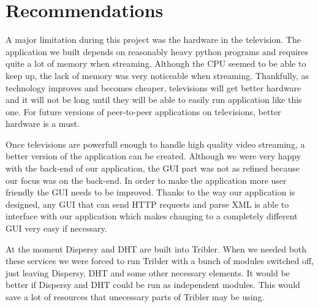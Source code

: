 \chapter{Recommendations}
\label{sec:recommendations}

A major limitation during this project was the hardware in the television. The application we built depends on reasonably heavy python programs and requires quite a lot of memory when streaming. Although the CPU seemed to be able to keep up, the lack of memory was very noticeable when streaming. Thankfully, as technology improves and becomes cheaper, televisions will get better hardware and it will not be long until they will be able to easily run application like this one. For future versions of peer-to-peer applications on televisions, better hardware is a must.

Once televisions are powerfull enough to handle high quality video streaming, a better version of the application can be created. Although we were very happy with the back-end of our application, the GUI part was not as refined because our focus was on the back-end. In order to make the application more user friendly the GUI needs to be improved. Thanks to the way our application is designed, any GUI that can send HTTP requests and parse XML is able to interface with our application which makes changing to a completely different GUI very easy if necessary.

At the moment Dispersy and DHT are built into Tribler. When we needed both these services we were forced to run Tribler with a bunch of modules switched off, just leaving Dispersy, DHT and some other necessary elements. It would be better if Dispersy and DHT could be run as independent modules. This would save a lot of resources that unecessary parts of Tribler may be using.
